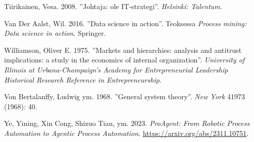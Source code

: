 \documentclass[
  finnish,
  letterpaper,
  DIV=11,
  numbers=noendperiod,
  oneside]{scrreprt}
\newlength{\cslhangindent}
\newenvironment{CSLReferences}[2] %
 {\begin{list}{}{%
  \setlength{\itemindent}{0pt}
  \setlength{\leftmargin}{0pt}
  \setlength{\parsep}{0pt}
  \ifodd #1
   \setlength{\leftmargin}{\cslhangindent}
   \setlength{\itemindent}{-1\cslhangindent}
  \fi
  \setlength{\itemsep}{#2\baselineskip}}}
 {\end{list}}
\begin{document}
\begin{CSLReferences}{1}{1}
Tiirikainen, Vesa. 2008. {''Johtaja: ole IT-strategi''}. \emph{Helsinki:
Talentum}.

Van Der Aalst, Wil. 2016. {''Data science in action''}. Teoksessa
\emph{Process mining: Data science in action}. Springer.

Williamson, Oliver E. 1975. {''Markets and hierarchies: analysis and
antitrust implications: a study in the economics of internal
organization''}. \emph{University of Illinois at Urbana-Champaign's
Academy for Entrepreneurial Leadership Historical Research Reference in
Entrepreneurship}.

{Von Bertalanffy, Ludwig ym.} 1968. {''General system theory''}.
\emph{New York} 41973 (1968): 40.

Ye, Yining, Xin Cong, Shizuo Tian, ym. 2023. \emph{ProAgent: From
Robotic Process Automation to Agentic Process Automation}.
\url{https://arxiv.org/abs/2311.10751}.

\end{CSLReferences}
\end{document}
